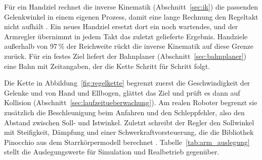 Für ein Handziel rechnet die inverse Kinematik (Abschnitt~\ref{sec:ik}) die passenden Gelenkwinkel in einem eigenen Prozess, damit eine lange Rechnung den Regeltakt nicht aufhält .
Ein neues Handziel ersetzt dort ein noch wartendes, und der Armregler übernimmt in jedem Takt das zuletzt gelieferte Ergebnis.
Handziele außerhalb von 97\,\% der Reichweite rückt die inverse Kinematik auf diese Grenze zurück.
Für ein festes Ziel liefert der Bahnplaner (Abschnitt~\ref{sec:bahnplaner}) eine Bahn mit Zeitangaben, der die Kette Schritt für Schritt folgt.

Die Kette in Abbildung~\ref{fig:regelkette} begrenzt zuerst die Geschwindigkeit der Gelenke und von Hand und Ellbogen, glättet das Ziel und prüft es dann auf Kollision (Abschnitt~\ref{sec:laufzeitueberwachung}).
Am realen Roboter begrenzt sie zusätzlich die Beschleunigung beim Anfahren und den Schleppfehler, also den Abstand zwischen Soll- und Istwinkel.
Zuletzt schreibt der Regler den Sollwinkel mit Steifigkeit, Dämpfung und einer Schwerkraftvorsteuerung, die die Bibliothek Pinocchio aus dem Starrkörpermodell berechnet \cite{Carpentier2019}.
Tabelle~\ref{tab:arm_auslegung} stellt die Auslegungswerte für Simulation und Realbetrieb gegenüber.

